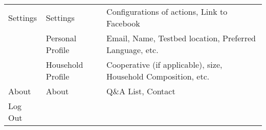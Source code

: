 {\begin{longtable}{ p{4cm}  p{4cm} p{6.5cm}}
Settings & Settings & Configurations of actions, Link to Facebook \\ 
& Personal Profile & Email, Name, Testbed location, Preferred Language, etc.  \\ 
& Household Profile & Cooperative (if applicable), size, Household Composition, etc.\\  \hline

About & About & Q\&A List, Contact\\ \hline
Log Out &   &  \\ \hline
\end{longtable}
} 

% 

